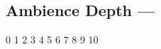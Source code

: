 \subsection[Ambience Depth]{Ambience Depth --- \UiKey{\SET}}









































0
1
2
3
4
5
6
7
8
9
10
